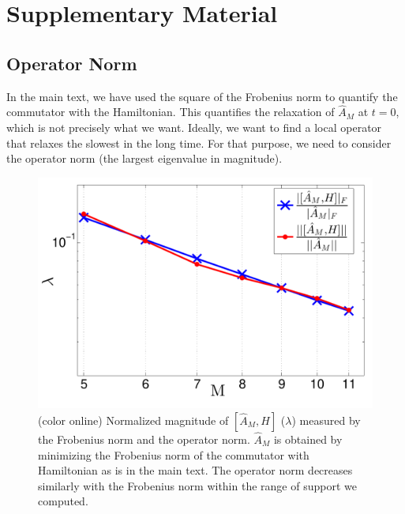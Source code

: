 \documentclass[twocolumn,superscriptaddress, prb]{revtex4-1}
\begin{document}
\section*{Supplementary Material}

\subsection{Operator Norm}
In the main text, we have used the square of the Frobenius norm to quantify the commutator with the Hamiltonian.
This quantifies the relaxation of $\hat{A}_M$ at $t = 0$,
which is not precisely what we want. Ideally, we want to find a local operator
that relaxes the slowest in the long time.
For that purpose, we need to consider the operator norm (the largest eigenvalue in magnitude).

\begin{figure}
\includegraphics[width=1.0\linewidth]{op_norm.pdf}
\centering
\caption{(color online) Normalized magnitude of $[\hat{A}_M, H]$ ($\lambda$) measured by the Frobenius norm and the operator norm.
$\hat{A}_M$ is obtained by minimizing the Frobenius norm of the commutator with Hamiltonian as is in the main text.
The operator norm decreases similarly with the Frobenius norm within the range of support we computed.
}
\label{fig:op_norm}
\end{figure}
\end{document}
